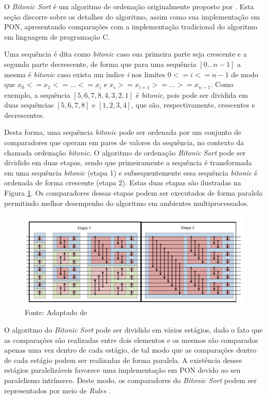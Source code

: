 O \textit{Bitonic Sort} é um algoritmo de ordenação originalmente proposto por
. Esta seção discorre sobre os detalhes do algoritmo,
assim como sua implementação em PON, apresentando comparações com a
implementação tradicional do algoritmo em linguagem de programação C.

Uma sequência é dita como \textit{bitonic} caso sua primeira parte seja
crescente e a segunda parte decrescente, de forma que para uma sequência \([0
... n-1]\) a mesma é \textit{bitonic} caso exista um índice \textit{i} nos
limites \(0<=i<=n-1\) de modo que \(x_0 <= x_1 <= ... <= x_i\) e \(x_i >=
x_{i+1} >= ... >= x_{n-1}\). Como exemplo, a sequência \([5, 6, 7, 8, 4, 3, 2,
1]\) é \textit{bitonic}, pois pode ser dividida em duas sequências \([5, 6, 7,
8]\) e \([1, 2, 3, 4]\), que são, respectivamente, crescentes e decrescentes.

Desta forma, uma sequência \textit{bitonic} pode ser ordenada por um conjunto de
comparadores que operam em pares de valores da sequência, no contexto da chamada
ordenação \textit{bitonic}. O algoritmo de ordenação \textit{Bitonic Sort} pode
ser dividido em duas etapas, sendo que primeiramente a sequência é transformada
em uma sequência \textit{bitonic} (etapa 1) e subsequentemente essa sequência
\textit{bitonic} é ordenada de forma crescente (etapa 2). Estas duas etapas são
ilustradas na Figura \ref{fig:bitonic_order}. Os comparadores dessas etapas
podem ser executados de forma paralela permitindo melhor desempenho do algoritmo
em ambientes multiprocessados.

\begin{figure}[!htb]
\centering
\includegraphics[width=\textwidth]{../figures/bitonic_sort_mod.png}
\smallskip
\caption{Processo de ordenação com \textit{Bitonic Sort}} \caption*{Fonte:
Adaptado de }
\label{fig:bitonic_order}
\end{figure}

O algoritmo do \textit{Bitonic Sort} pode ser dividido em vários estágios, dado
o fato que as comparações são realizadas entre dois elementos e os mesmos são
comparados apenas uma vez dentro de cada estágio, de tal modo que as comparações
dentro de cada estágio podem ser realizadas de forma paralela. A existência
desses estágios paralelizáveis favorece uma implementação em PON devido ao seu
paralelismo intrínseco. Deste modo, os comparadores do \textit{Bitonic Sort}
podem ser representados por meio de \textit{Rules}
\cite{quali_pordeus_2020,pordeus_2021}.

